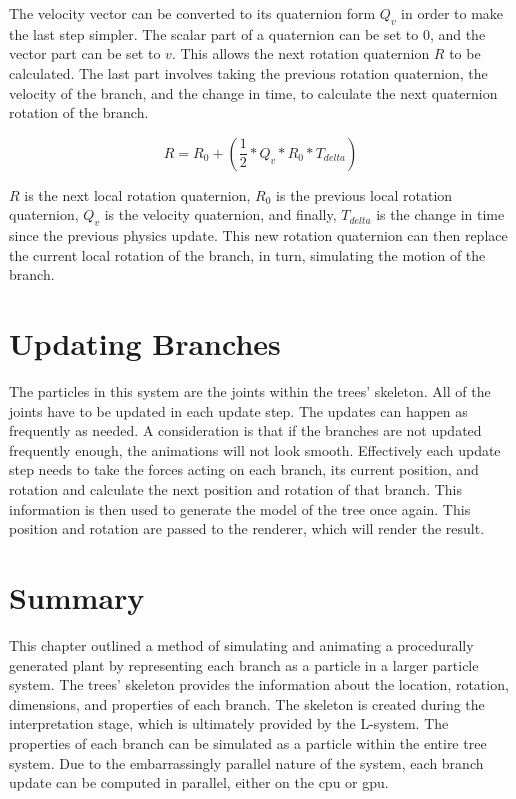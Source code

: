 \noindent
The velocity vector can be converted to its quaternion form $Q_v$ in order to make the last step simpler. The scalar part of a quaternion can be set to 0, and the vector part can be set to $v$. This allows the next rotation quaternion $R$ to be calculated. The last part involves taking the previous rotation quaternion, the velocity of the branch, and the change in time, to calculate the next quaternion rotation of the branch.

\begin{equation}
R = R_0 + (\frac{1}{2} * Q_v * R_0 * T_{delta})
\end{equation}

\noindent
$R$ is the next local rotation quaternion, $R_0$ is the previous local rotation quaternion, $Q_v$ is the velocity quaternion, and finally, $T_{delta}$ is the change in time since the previous physics update. This new rotation quaternion can then replace the current local rotation of the branch, in turn, simulating the motion of the branch.

\section{Updating Branches}

The particles in this system are the joints within the trees' skeleton. All of the joints have to be updated in each update step. The updates can happen as frequently as needed. A consideration is that if the branches are not updated frequently enough, the animations will not look smooth. Effectively each update step needs to take the forces acting on each branch, its current position, and rotation and calculate the next position and rotation of that branch. This information is then used to generate the model of the tree once again. This position and rotation are passed to the renderer, which will render the result.

\newpage
\section{Summary}

This chapter outlined a method of simulating and animating a procedurally generated plant by representing each branch as a  particle in a larger particle system. The trees' skeleton provides the information about the location, rotation, dimensions, and properties of each branch. The skeleton is created during the interpretation stage, which is ultimately provided by the L-system. The properties of each branch can be simulated as a particle within the entire tree system. Due to the embarrassingly parallel nature of the system, each branch update can be computed in parallel, either on the \acrshort{cpu} or \acrshort{gpu}.    

